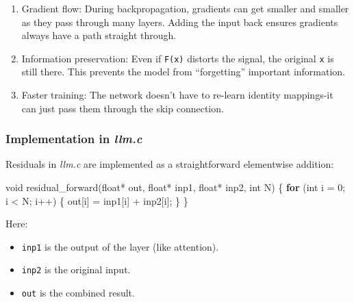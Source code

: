 \documentclass[
  letterpaper,
  DIV=11,
  numbers=noendperiod]{scrreprt}
\newenvironment{Shaded}{\begin{snugshade}}{\end{snugshade}}
\newcommand{\ControlFlowTok}[1]{\textcolor[rgb]{0.00,0.23,0.31}{\textbf{#1}}}
\newcommand{\DataTypeTok}[1]{\textcolor[rgb]{0.68,0.00,0.00}{#1}}
\newcommand{\DecValTok}[1]{\textcolor[rgb]{0.68,0.00,0.00}{#1}}
\newcommand{\NormalTok}[1]{\textcolor[rgb]{0.00,0.23,0.31}{#1}}
\newcommand{\OperatorTok}[1]{\textcolor[rgb]{0.37,0.37,0.37}{#1}}
\providecommand{\tightlist}{%
  \setlength{\itemsep}{0pt}\setlength{\parskip}{0pt}}
\begin{document}
\begin{enumerate}
\def\labelenumi{\arabic{enumi}.}
\tightlist
\item
  Gradient flow: During backpropagation, gradients can get smaller and
  smaller as they pass through many layers. Adding the input back
  ensures gradients always have a path straight through.
\item
  Information preservation: Even if \texttt{F(x)} distorts the signal,
  the original \texttt{x} is still there. This prevents the model from
  ``forgetting'' important information.
\item
  Faster training: The network doesn't have to re-learn identity
  mappings-it can just pass them through the skip connection.
\end{enumerate}

\subsubsection{\texorpdfstring{Implementation in
\emph{llm.c}}{Implementation in llm.c}}\label{implementation-in-llm.c-3}

Residuals in \emph{llm.c} are implemented as a straightforward
elementwise addition:

\begin{Shaded}
\begin{Highlighting}[]
\DataTypeTok{void}\NormalTok{ residual\_forward}\OperatorTok{(}\DataTypeTok{float}\OperatorTok{*}\NormalTok{ out}\OperatorTok{,} \DataTypeTok{float}\OperatorTok{*}\NormalTok{ inp1}\OperatorTok{,} \DataTypeTok{float}\OperatorTok{*}\NormalTok{ inp2}\OperatorTok{,} \DataTypeTok{int}\NormalTok{ N}\OperatorTok{)} \OperatorTok{\{}
    \ControlFlowTok{for} \OperatorTok{(}\DataTypeTok{int}\NormalTok{ i }\OperatorTok{=} \DecValTok{0}\OperatorTok{;}\NormalTok{ i }\OperatorTok{\textless{}}\NormalTok{ N}\OperatorTok{;}\NormalTok{ i}\OperatorTok{++)} \OperatorTok{\{}
\NormalTok{        out}\OperatorTok{[}\NormalTok{i}\OperatorTok{]} \OperatorTok{=}\NormalTok{ inp1}\OperatorTok{[}\NormalTok{i}\OperatorTok{]} \OperatorTok{+}\NormalTok{ inp2}\OperatorTok{[}\NormalTok{i}\OperatorTok{];}
    \OperatorTok{\}}
\OperatorTok{\}}
\end{Highlighting}
\end{Shaded}

Here:

\begin{itemize}
\tightlist
\item
  \texttt{inp1} is the output of the layer (like attention).
\item
  \texttt{inp2} is the original input.
\item
  \texttt{out} is the combined result.
\end{itemize}
\end{document}
